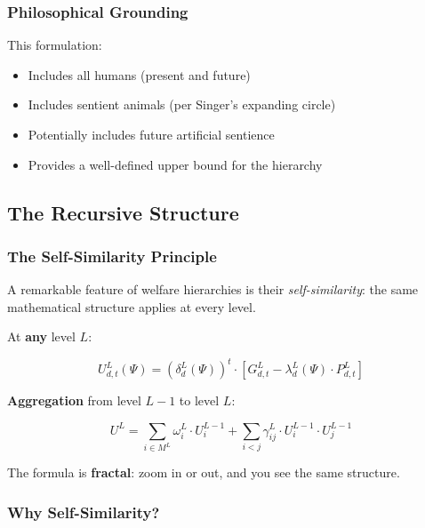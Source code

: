 \documentclass[12pt,a4paper]{article}
\begin{document}
\subsubsection{Philosophical Grounding}

This formulation:
\begin{itemize}[nosep]
\item Includes all humans (present and future)
\item Includes sentient animals (per Singer's expanding circle)
\item Potentially includes future artificial sentience
\item Provides a well-defined upper bound for the hierarchy
\end{itemize}

\subsection{The Recursive Structure}

\subsubsection{The Self-Similarity Principle}

A remarkable feature of welfare hierarchies is their \textit{self-similarity}: 
the same mathematical structure applies at every level.

\begin{tcolorbox}[colback=yellow!5!white, colframe=yellow!50!black, title=The Recursive Welfare Formula]
At \textbf{any} level $L$:

\begin{equation}
\boxed{
U^L_{d,t}(\Psi) = \left(\delta^L_d(\Psi)\right)^t \cdot \left[ G^L_{d,t} - \lambda^L_d(\Psi) \cdot P^L_{d,t} \right]
}
\label{eq:recursive-utility}
\end{equation}

\textbf{Aggregation} from level $L-1$ to level $L$:

\begin{equation}
\boxed{
U^L = \sum_{i \in M^L} \omega^L_i \cdot U^{L-1}_i + \sum_{i < j} \gamma^L_{ij} \cdot U^{L-1}_i \cdot U^{L-1}_j
}
\label{eq:aggregation}
\end{equation}

The formula is \textbf{fractal}: zoom in or out, and you see the same structure.
\end{tcolorbox}

\subsubsection{Why Self-Similarity?}
\end{document}

